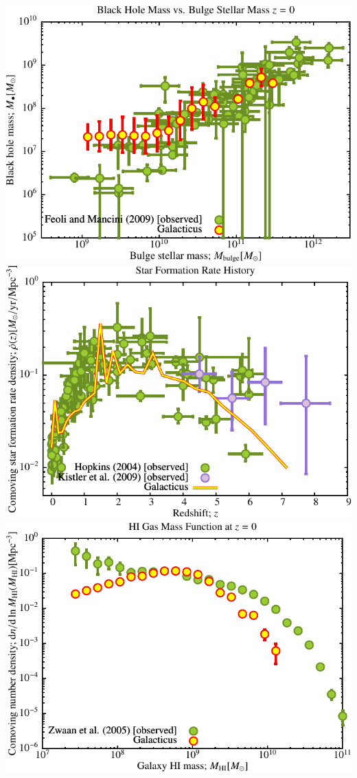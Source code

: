 \documentclass[a4paper,11pt,fleqn,oneside]{book}
\begin{document}
\includegraphics[scale=0.6]{drd5_r256/Black_Hole_vs_Bulge_Mass.pdf}
\includegraphics[scale=0.6]{drd5_r256/Star_Formation_History.pdf}
\includegraphics[scale=0.6]{drd5_r256/HI_Gas_Mass_Function.pdf}
\end{document}
